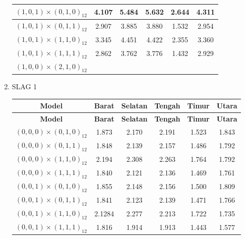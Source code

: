 \begin{enumerate}[label=\alph*.]
\begin{longtable}{|c|c|c|c|c|c|}
        {$(1,0,1) \times (0,1,0)_{12}$} & 4.107 & 5.484 & 5.632 & 2.644 & 4.311 \\ \hline
        {$(1,0,1) \times (0,1,1)_{12}$} & 2.907 & 3.885 & 3.880 & 1.532 & 2.954 \\ \hline
        {$(1,0,1) \times (1,1,0)_{12}$} & 3.345 & 4.451 & 4.422 & 2.355 & 3.360 \\ \hline
        {$(1,0,1) \times (1,1,1)_{12}$} & 2.862 & 3.762 & 3.776 & 1.432 & 2.929 \\ \hline

        {$(1,0,0) \times (2,1,0)_{12}$} &  &  &  &  &  \\ \hline

    \end{longtable}


    \item SLAG 1
    \begin{longtable}{|c|c|c|c|c|c|}
        \hline
        \textbf{Model} & \textbf{Barat} & \textbf{Selatan} & \textbf{Tengah} & \textbf{Timur} & \textbf{Utara} \\
        \hline
        \endfirsthead

        \hline
        \textbf{Model} & \textbf{Barat} & \textbf{Selatan} & \textbf{Tengah} & \textbf{Timur} & \textbf{Utara} \\
        \hline
        \endhead

        \hline
        \endfoot
        \hline
        \endlastfoot

        {$(0,0,0) \times (0,1,0)_{12}$} & 1.873 & 2.170 & 2.191 & 1.523 & 1.843 \\ \hline
        {$(0,0,0) \times (0,1,1)_{12}$} & 1.848 & 2.139 & 2.157 & 1.486 & 1.792 \\ \hline
        {$(0,0,0) \times (1,1,0)_{12}$} & 2.194 & 2.308 & 2.263 & 1.764 & 1.792 \\ \hline
        {$(0,0,0) \times (1,1,1)_{12}$} & 1.840 & 2.121 & 2.136 & 1.469 & 1.761 \\ \hline

        {$(0,0,1) \times (0,1,0)_{12}$} & 1.855 & 2.148 & 2.156 & 1.500 & 1.809 \\ \hline
        {$(0,0,1) \times (0,1,1)_{12}$} & 1.841 & 2.123 & 2.139 & 1.471 & 1.766 \\ \hline
        {$(0,0,1) \times (1,1,0)_{12}$} & 2.1284 & 2.277 & 2.213 & 1.722 & 1.735 \\ \hline
        {$(0,0,1) \times (1,1,1)_{12}$} & 1.816 & 1.914 & 1.913 & 1.443 & 1.577 \\ \hline


\end{longtable}
\end{enumerate}
